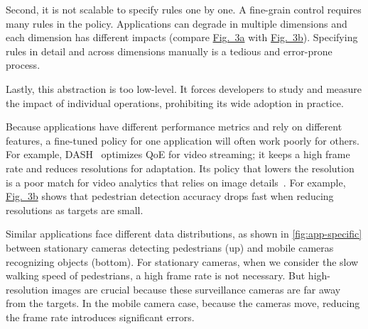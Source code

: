 Second, it is not scalable to specify rules one by one. A fine-grain control
requires many rules in the policy. Applications can degrade in multiple
dimensions and each dimension has different impacts (compare
\hyperref[fig:app-specific]{Fig.~3a} with \hyperref[fig:app-specific]{Fig.~3b}).
Specifying rules in detail and across dimensions manually is a tedious and
error-prone process.

Lastly, this abstraction is too low-level. It forces developers to study and
measure the impact of individual operations, prohibiting its wide adoption in
practice.

 Because
applications have different performance metrics and rely on different features,
a fine-tuned policy for one application will often work poorly for others. For
example, DASH~\cite{sodagar2011mpeg} optimizes QoE for video streaming; it keeps
a high frame rate and reduces resolutions for adaptation. Its policy that lowers
the resolution is a poor match for video analytics that relies on image
details~\cite{lowe2004distinctive, viola2001rapid}. For example,
\hyperref[fig:app-specific]{Fig.~3b} shows that pedestrian detection accuracy
drops fast when reducing resolutions as targets are small.

Similar applications face different data distributions, as shown in
\autoref{fig:app-specific} between stationary cameras detecting pedestrians (up)
and mobile cameras recognizing objects (bottom). For stationary cameras, when we
consider the slow walking speed of pedestrians, a high frame rate is not
necessary. But high-resolution images are crucial because these surveillance
cameras are far away from the targets. In the mobile camera case, because the
cameras move, reducing the frame rate introduces significant errors.


